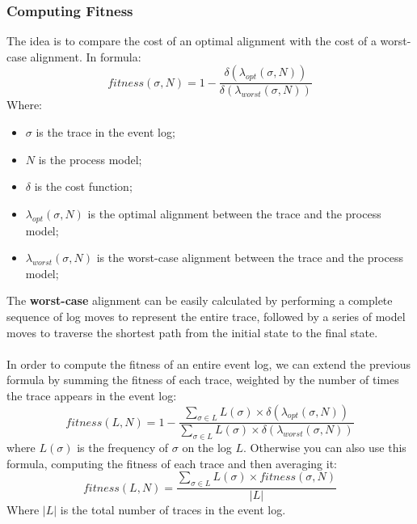 \subsubsection*{Computing Fitness}
The idea is to compare the cost of an optimal alignment with the cost of a worst-case alignment.
In formula:
\begin{equation}
    fitness(\sigma, N) = 1 - \frac{\delta(\lambda_{opt}(\sigma, N))}{\delta(\lambda_{worst}(\sigma, N))}
\end{equation}
Where:
\begin{itemize}
    \item $\sigma$ is the trace in the event log;
    \item $N$ is the process model;
    \item $\delta$ is the cost function;
    \item $\lambda_{opt}(\sigma, N)$ is the optimal alignment between the trace and the process model;
    \item $\lambda_{worst}(\sigma, N)$ is the worst-case alignment between the trace and the process model;
\end{itemize}
The \textbf{worst-case} alignment can be easily calculated by performing a complete sequence of log moves to represent the entire trace, followed by a series of model moves to traverse the shortest path from the initial state to the final state.
\\\\In order to compute the fitness of an entire event log, we can extend the previous formula by summing the fitness of each trace, weighted by the number of times the trace appears in the event log:
\begin{equation}
    fitness(L, N) = 1 - \frac{\sum_{\sigma \in L} L(\sigma) \times \delta(\lambda_{opt}(\sigma, N))}{\sum_{\sigma \in L} L(\sigma) \times \delta(\lambda_{worst}(\sigma, N))}
\end{equation}
where $L(\sigma)$ is the frequency of $\sigma$ on the log $L$.
Otherwise you can also use this formula, computing the fitness of each trace and then averaging it:
\begin{equation}
    fitness(L, N) = \frac{\sum_{\sigma \in L} L(\sigma) \times fitness(\sigma, N)}{|L|}
\end{equation}
Where $|L|$ is the total number of traces in the event log.